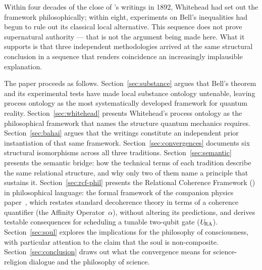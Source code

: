 Within four decades of the close of \Bahaullah's writings in 1892,
Whitehead had set out the framework philosophically; within eight,
experiments on Bell's inequalities had begun to rule out its classical
local alternative.
This sequence does not prove supernatural authority --- that is not the
argument being made here.
What it supports is that three independent methodologies arrived at
the same structural conclusion in a sequence that renders coincidence an
increasingly implausible explanation.

The paper proceeds as follows.
Section~\ref{sec:substance} argues that Bell's theorem and its experimental
tests have made local substance ontology untenable, leaving process ontology
as the most systematically developed framework for quantum reality.
Section~\ref{sec:whitehead} presents Whitehead's process ontology as the
philosophical framework that names the structure quantum mechanics requires.
Section~\ref{sec:bahai} argues that the \bahai writings constitute
an independent prior instantiation of that same framework.
Section~\ref{sec:convergences} documents six structural isomorphisms across
all three traditions.
Section~\ref{sec:semantic} presents the semantic bridge: how the technical
terms of each tradition describe the same relational structure, and why
only two of them name a principle that sustains it.
Section~\ref{sec:rcf-phil} presents the Relational Coherence Framework (\RCF)
in philosophical language: the formal framework of the companion
physics paper~\citep{Adams2026Physics}, which restates standard decoherence
theory in terms of a coherence quantifier (the Affinity Operator~$\alpha$),
without altering its predictions, and derives testable consequences for
scheduling a tunable two-qubit gate ($U_{\!\mathrm{RA}}$).
Section~\ref{sec:soul} explores the implications for the philosophy of
consciousness, with particular attention to the \bahai claim that the
soul is non-composite.
Section~\ref{sec:conclusion} draws out what the convergence means for
science-religion dialogue and the philosophy of science.

